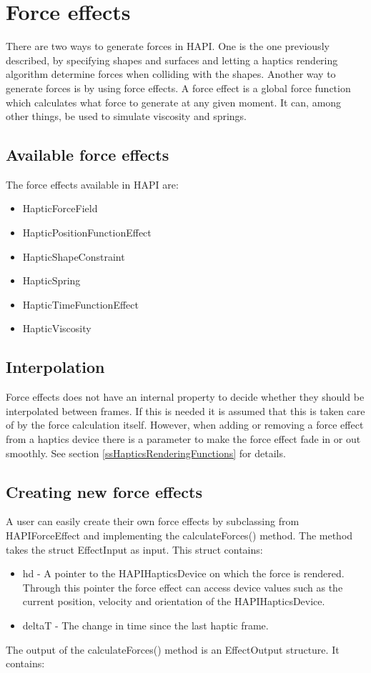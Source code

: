 \chapter{Force effects}
There are two ways to generate forces in HAPI. One is the one
previously described, by specifying shapes and surfaces and letting
a haptics rendering algorithm determine forces when colliding with the
shapes. Another way to generate forces is by using force effects. A
force effect is a global force function which calculates what force to
generate at any given moment. It can, among other things, be used to simulate
viscosity and springs. 

\section{Available force effects}
The force effects available in HAPI are:

\begin{itemize}
\item HapticForceField
\item HapticPositionFunctionEffect
\item HapticShapeConstraint
\item HapticSpring
\item HapticTimeFunctionEffect 
\item HapticViscosity
\end{itemize}

\section{Interpolation}
Force effects does not have an internal property to decide whether they
should be interpolated between frames. If this is needed it is assumed
that this is taken care of by the force calculation itself. However,
when adding or removing a force effect from a haptics device there
is a parameter to make the force effect fade in or out smoothly. See section
\ref{ssHapticsRenderingFunctions} for details.

\section{Creating new force effects}
A user can easily create their own force effects by subclassing from
HAPIForceEffect and implementing the calculateForces() method. The
method takes the struct EffectInput as input. This struct contains:

\begin{itemize}
\item hd - A pointer to the HAPIHapticsDevice on which the force is rendered.
Through this pointer the force effect can access device values such as
the current position, velocity and orientation of the HAPIHapticsDevice.
\item deltaT - The change in time since the last haptic frame.
\end{itemize}
The output of the calculateForces() method is an EffectOutput structure.
It contains:

